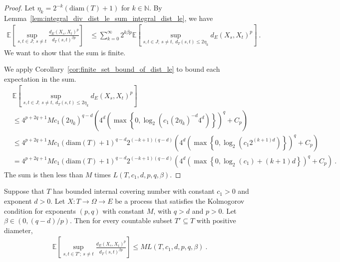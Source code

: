 \begin{proof}
Let $\eta_k = 2^{-k}(\mathrm{diam}(T) + 1)$ for $k \in \mathbb{N}$.
By Lemma~\ref{lem:integral_div_dist_le_sum_integral_dist_le}, we have
\begin{align*}
  \mathbb{E}\left[ \sup_{s, t \in J;\: s \ne t} \frac{d_E(X_s, X_t)^p}{d_T(s, t)^{\beta p}} \right]
  &\le \sum_{k=0}^\infty 2^{k \beta p} \mathbb{E}\left[ \sup_{s, t \in J;\: s \ne t, \: d_T(s, t) \le 2 \eta_k} d_E(X_s, X_t)^p \right]
  \: .
\end{align*}
We want to show that the sum is finite.

We apply Corollary~\ref{cor:finite_set_bound_of_dist_le} to bound each expectation in the sum.
\begin{align*}
  &\mathbb{E}\left[ \sup_{s, t \in J;\: s \ne t, \: d_T(s, t) \le 2 \eta_k} d_E(X_s, X_t)^p \right]
  \\
  &\le 4^{p+2q+1} M c_1 (2 \eta_k)^{q-d} \left(4^d \left(\max\left\{0, \log_2 \left(c_1 (2 \eta_k)^{-d} 4^d \right) \right\} \right)^q
    + C_p\right)
  \\
  &\le 4^{p+2q+1} M c_1 (\mathrm{diam}(T)+1)^{q-d} 2^{(-k + 1)(q-d)} \left(4^d \left(\max\left\{0, \log_2 \left(c_1 2^{(k + 1)d} \right) \right\} \right)^q
    + C_p\right)
  \\
  &= 4^{p+2q+1} M c_1 (\mathrm{diam}(T)+1)^{q-d} 2^{(-k + 1)(q-d)} \left(4^d \left(\max\left\{0, \log_2(c_1) + (k + 1)d \right\} \right)^q
    + C_p\right)
  \: .
\end{align*}
The sum is then less than $M$ times $L(T, c_1, d, p, q, \beta)$.
\end{proof}


\begin{theorem}\label{thm:countable_set_bound}
  \leanok
Suppose that $T$ has bounded internal covering number with constant $c_1>0$ and exponent $d > 0$.
Let $X : T \to \Omega \to E$ be a process that satisfies the Kolmogorov condition for exponents $(p,q)$ with constant $M$, with $q > d$ and $p > 0$.
Let $\beta \in(0, (q - d)/p)$.
Then for every countable subset $T' \subseteq T$ with positive diameter,
\begin{align*}
  \mathbb{E}\left[ \sup_{s, t \in T';\: s \ne t} \frac{d_E(X_s, X_t)^p}{d_T(s, t)^{\beta p}} \right]
  \le M L(T, c_1, d, p, q, \beta)
  \: .
\end{align*}
\end{theorem}

